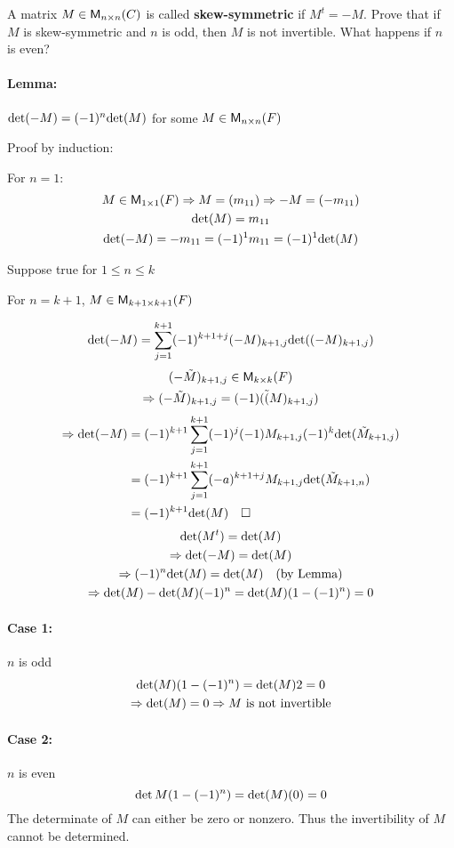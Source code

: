 A matrix $M \in \mathsf{M}_{n \times n}(C)$ is called {\bf skew-symmetric} if
$M^t=-M$. Prove that if $M$ is skew-symmetric and $n$ is odd, then $M$
is not invertible. What happens if $n$ is even?

\paragraph{Lemma: } $\text{det}({-M}) = (-1)^n\text{det}({M})$ for some $M \in
\mathsf{M}_{n \times n}(F)$

Proof by induction:

For $n=1$: 
\begin{gather}
M \in \mathsf{M}_{1 \times 1}(F) \Rightarrow M = (m_{11}) \Rightarrow -M =
(-m_{11})\\
\text{det}({M}) = m_{11}\\
\text{det}({-M}) = -m_{11} = (-1)^1m_{11} = (-1)^1\text{det}({M})
\end{gather}

Suppose true for $1\leq n \leq k$ 

For $n=k+1$, $M \in \mathsf{M}_{k+1 \times k+1}(F)$

\begin{equation}
\text{det}({-M}) =
\sum\limits_{j=1}^{k+1}(-1)^{k+1+j}(-M)_{k+1,j}\text{det}({(-M)_{k+1,j}})
\end{equation}
\begin{gather}
(-\tilde{M})_{k+1,j} \in \mathsf{M}_{k \times k}(F)\\
\Rightarrow (-\tilde{M})_{k+1,j} = (-1)(\tilde(M)_{k+1,j})
\end{gather}
\begin{align}
\Rightarrow \text{det}({-M}) &=
(-1)^{k+1}\sum\limits_{j=1}^{k+1}(-1)^j(-1)M_{k+1,j}(-1)^k\text{det}({\tilde{M}_{k+1,j}})\\
&=
(-1)^{k+1}\sum\limits_{j=1}^{k+1}(-a)^{k+1+j}M_{k+1,j}\text{det}({\tilde{M}_{k+1,n}})\\
&= (-1)^{k+1}\text{det}({M})\quad \square
\end{align}
\begin{gather}
\text{det}({M^t}) = \text{det}({M})\\
\Rightarrow \text{det}({-M}) = \text{det}({M})\\
\Rightarrow (-1)^n\text{det}({M}) = \text{det}({M}) \quad \text{(by Lemma)}\\
\Rightarrow \text{det}({M}) - \text{det}({M})(-1)^n = \text{det}({M})(1- (-1)^n) = 0
\end{gather}
\paragraph{Case 1:} $n$ is odd
\begin{gather}
\text{det}({M})(1-(-1)^n) = \text{det}({M}){2} = 0\\
\Rightarrow \text{det}({M}) = 0
\Rightarrow M \text{ is not invertible} \notag
\end{gather}
\paragraph{Case 2:} $n$ is even
\begin{equation}
\det{M}(1- (-1)^n) =\text{det}({M})(0) = 0
\end{equation}
The determinate of $M$ can either be zero or nonzero. Thus the
invertibility of $M$ cannot be determined.
